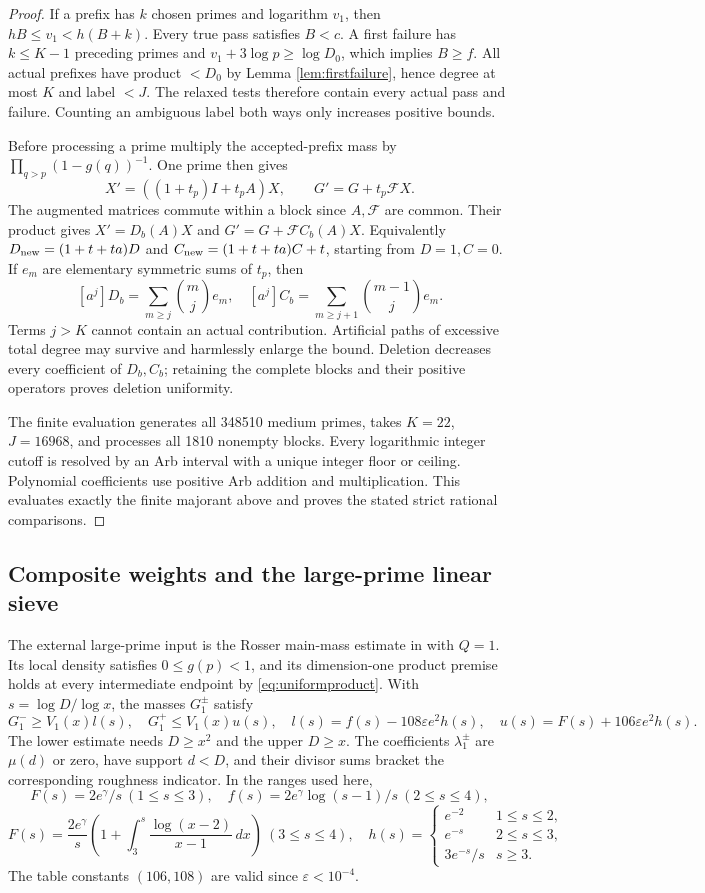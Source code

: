 \documentclass[11pt]{article}
\theoremstyle{remark}\newtheorem{remark}[theorem]{Remark}
\newcommand{\eps}{\varepsilon}
\begin{document}
\begin{proof}
If a prefix has $k$ chosen primes and logarithm $v_1$, then
$hB\le v_1<h(B+k)$. Every true pass satisfies $B<c$.
A first failure has $k\le K-1$ preceding primes and
$v_1+3\log p\ge\log D_0$, which implies $B\ge f$.
All actual prefixes have product $<D_0$ by Lemma \ref{lem:firstfailure},
hence degree at most $K$ and label $<J$. The relaxed tests therefore
contain every actual pass and failure. Counting an ambiguous label both
ways only increases positive bounds.

Before processing a prime multiply the accepted-prefix mass by
$\prod_{q>p}(1-g(q))^{-1}$. One prime then gives
\[
X'=((1+t_p)I+t_pA)X,\qquad G'=G+t_p\mathcal FX.
\]
The augmented matrices commute within a block since $A,\mathcal F$ are
common. Their product gives $X'=D_b(A)X$ and
$G'=G+\mathcal FC_b(A)X$.
Equivalently $D_{\rm new}=(1+t+ta)D$ and
$C_{\rm new}=(1+t+ta)C+t$, starting from $D=1,C=0$.
If $e_m$ are elementary symmetric sums of $t_p$, then
\[
[a^j]D_b=\sum_{m\ge j}\binom mj e_m,\quad
[a^j]C_b=\sum_{m\ge j+1}\binom{m-1}j e_m.
\]
Terms $j>K$ cannot contain an actual contribution. Artificial paths
of excessive total degree may survive and harmlessly enlarge the bound.
Deletion decreases every coefficient of $D_b,C_b$; retaining the complete
blocks and their positive operators proves deletion uniformity.

The finite evaluation generates all 348510 medium primes, takes $K=22$,
$J=16968$, and processes all 1810 nonempty blocks.
Every logarithmic integer cutoff is resolved by an Arb interval with
a unique integer floor or ceiling. Polynomial coefficients use positive
Arb addition and multiplication. This evaluates exactly the finite
majorant above and proves the stated strict rational comparisons.
\end{proof}

\subsection{Composite weights and the large-prime linear sieve}
The external large-prime input is the Rosser main-mass estimate in
\cite[Theorem 6, Proposition 13 and Table 1]{BJS} with $Q=1$.
Its local density satisfies $0\le g(p)<1$, and its dimension-one product
premise holds at every intermediate endpoint by \eqref{eq:uniformproduct}.
With $s=\log D/\log x$, the masses $G_1^\pm$ satisfy
\[
G_1^-\ge V_1(x)l(s),\quad G_1^+\le V_1(x)u(s),\quad
l(s)=f(s)-108\eps e^2h(s),\quad u(s)=F(s)+106\eps e^2h(s).
\]
The lower estimate needs $D\ge x^2$ and the upper $D\ge x$.
The coefficients $\lambda_1^\pm$ are $\mu(d)$ or zero, have support
$d<D$, and their divisor sums bracket the corresponding roughness indicator.
In the ranges used here,
\[
F(s)=2e^\gamma/s\ (1\le s\le3),\quad
f(s)=2e^\gamma\log(s-1)/s\ (2\le s\le4),
\]
\[
F(s)=\frac{2e^\gamma}{s}\left(1+\int_3^s\frac{\log(x-2)}{x-1}\,dx\right)
\ (3\le s\le4),\quad
h(s)=\begin{cases}e^{-2}&1\le s\le2,\\e^{-s}&2\le s\le3,\\3e^{-s}/s&s\ge3.\end{cases}
\]
The table constants $(106,108)$ are valid since $\eps<10^{-4}$.
\end{document}
